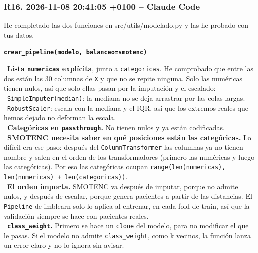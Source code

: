 \documentclass[11pt,a4paper]{article}
\begin{document}
\subsubsection*{R16. 2026-11-08 20:41:05 +0100 -- Claude Code}
{\small
He completado las dos funciones en src/\allowbreak{}utils/\allowbreak{}modelado.py y las he probado con tus datos.

\textbf{\texttt{crear\_\allowbreak{}pipeline(modelo, balanceo=\textquotedbl{}smotenc\textquotedbl{})}}

\hspace*{1.0em}\textbullet~\textbf{Lista \texttt{numericas} explícita}, junto a \texttt{categoricas}. He comprobado que entre las dos están las 30 columnas de \texttt{X} y que no se repite ninguna. Solo las numéricas tienen nulos, así que solo ellas pasan por la imputación y el escalado: \\{}
\hspace*{2.0em}\textbullet~\texttt{SimpleImputer(median)}: la mediana no se deja arrastrar por las colas largas. \\{}
\hspace*{2.0em}\textbullet~\texttt{RobustScaler}: escala con la mediana y el IQR, así que los extremos reales que hemos dejado no deforman la escala. \\{}
\hspace*{1.0em}\textbullet~\textbf{Categóricas en \texttt{passthrough}.} No tienen nulos y ya están codificadas. \\{}
\hspace*{1.0em}\textbullet~\textbf{SMOTENC necesita saber en qué posiciones están las categóricas.} Lo difícil era ese paso: después del \texttt{ColumnTransformer} las columnas ya no tienen nombre y salen en el orden de los transformadores (primero las numéricas y luego las categóricas). Por eso las categóricas ocupan \texttt{range(len(numericas), len(numericas) + len(categoricas))}. \\{}
\hspace*{1.0em}\textbullet~\textbf{El orden importa.} SMOTENC va después de imputar, porque no admite nulos, y después de escalar, porque genera pacientes a partir de las distancias. El \texttt{Pipeline} de imblearn solo lo aplica al entrenar, en cada fold de train, así que la validación siempre se hace con pacientes reales. \\{}
\hspace*{1.0em}\textbullet~\textbf{\texttt{class\_\allowbreak{}weight}.} Primero se hace un \texttt{clone} del modelo, para no modificar el que le pasas. Si el modelo no admite \texttt{class\_\allowbreak{}weight}, como k vecinos, la función lanza un error claro y no lo ignora sin avisar.

}
\end{document}
